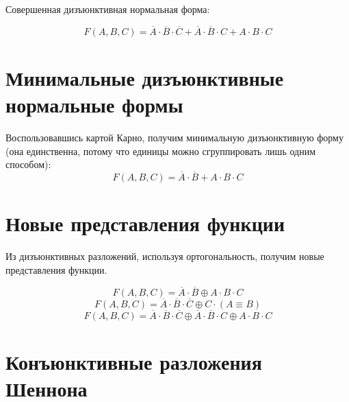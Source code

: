 \documentclass[a4paper,10pt]{article} %
\begin{document}
	Совершенная дизъюнктивная нормальная форма: 
	
	\begin{equation}
		F(A, B, C) = \overline{A} \cdot \overline{B} \cdot \overline{C} +
		\overline{A} \cdot \overline{B} \cdot C + 
		A \cdot B \cdot C 
	\end{equation}
	
	\section{Минимальные дизъюнктивные нормальные формы}
	
	Воспользовавшись картой Карно, получим минимальную дизъюнктивную форму (она единственна, потому что единицы можно сгруппировать лишь одним способом):
	\begin{equation}
		F(A, B, C) = \overline{A} \cdot \overline{B} + A \cdot B \cdot C 
	\end{equation}

	\section{Новые представления функции}
	
	Из дизъюнктивных разложений, используя ортогональность, получим новые представления функции.
	
	\begin{equation}
		F(A, B, C) = \overline{A} \cdot \overline{B} \oplus A \cdot B \cdot C
	\end{equation}
	\begin{equation}
		F(A, B, C) = \overline{A} \cdot \overline{B} \cdot \overline{C} 
		\oplus C \cdot (A \equiv B) 
	\end{equation}
	\begin{equation}
		F(A, B, C) = \overline{A} \cdot \overline{B} \cdot \overline{C} \oplus
		\overline{A} \cdot \overline{B} \cdot C \oplus
		A \cdot B \cdot C 
	\end{equation}
	
	\section{Конъюнктивные разложения Шеннона}
	
\end{document}
